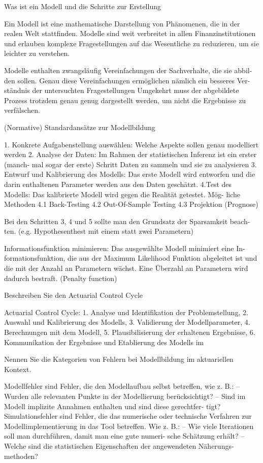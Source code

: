 Was ist ein Modell und die Schritte zur Erstellung


Ein Modell ist eine mathematische Darstellung von Phänomenen, die in der realen
Welt stattfinden. Modelle sind weit verbreitet in allen Finanzinstitutionen und erlauben komplexe Fragestellungen auf das Wesentliche zu reduzieren, um sie leichter zu verstehen.

Modelle enthalten zwangsläufig Vereinfachungen der Sachverhalte, die sie abbil-
den sollen. Genau diese Vereinfachungen ermöglichen nämlich ein besseres Ver-
ständnis der untersuchten Fragestellungen
Umgekehrt muss
der abgebildete Prozess trotzdem genau genug dargestellt werden, um nicht die
Ergebnisse zu verfälschen.

(Normative) Standardansätze zur Modellbildung

1. Konkrete Aufgabenstellung auswählen: Welche Aspekte sollen genau modelliert werden
2. Analyse der Daten: Im Rahmen der statistischen Inferenz ist ein erster (manch-
mal sogar der erste) Schritt Daten zu sammeln und sie zu analysieren
3. Entwurf und Kalibrierung des Modells: Das erste Modell wird entworfen und die
darin enthaltenen Parameter werden aus den Daten geschätzt.
4.Test des Modells: Das kalibrierte Modell wird gegen die Realität getestet. Mög-
liche Methoden
4.1 Back-Testing
4.2 Out-Of-Sample Testing
4.3 Projektion (Prognose)

Bei den Schritten 3, 4 und 5 sollte man den Grundsatz der Sparsamkeit beach-
ten. (e.g. Hypothesenthest mit einem statt zwei Parametern)

Informationsfunktion minimieren: Das ausgewählte Modell minimiert eine In-
formationsfunktion, die aus der Maximum Likelihood Funktion abgeleitet ist
und die mit der Anzahl an Parametern wächst. Eine Überzahl an Parametern
wird dadurch bestraft. (Penalty function)




Beschreiben Sie den Actuarial Control Cycle

Actuarial Control
Cycle:
1. Analyse und Identifikation der Problemstellung,
2. Auswahl und Kalibrierung des Modells,
3. Validierung der Modellparameter,
4. Berechnungen mit dem Modell,
5. Plausibilisierung der erhaltenen Ergebnisse,
6. Kommunikation der Ergebnisse und Etablierung des Modells im 



Nennen Sie die Kategorien von Fehlern bei Modellbildung im aktuariellen Kontext.

Modellfehler sind Fehler, die den Modellaufbau selbst betreffen, wie z. B.:
– Wurden alle relevanten Punkte in der Modellierung berücksichtigt?
– Sind im Modell implizite Annahmen enthalten und sind diese gerechtfer-
tigt?
Simulationsfehler sind Fehler, die das numerische oder technische Verfahren
zur Modellimplementierung in das Tool betreffen. Wie z. B.:
– Wie viele Iterationen soll man durchführen, damit man eine gute numeri-
sche Schätzung erhält?
– Welche sind die statistischen Eigenschaften der angewendeten Näherungs-
methoden?



